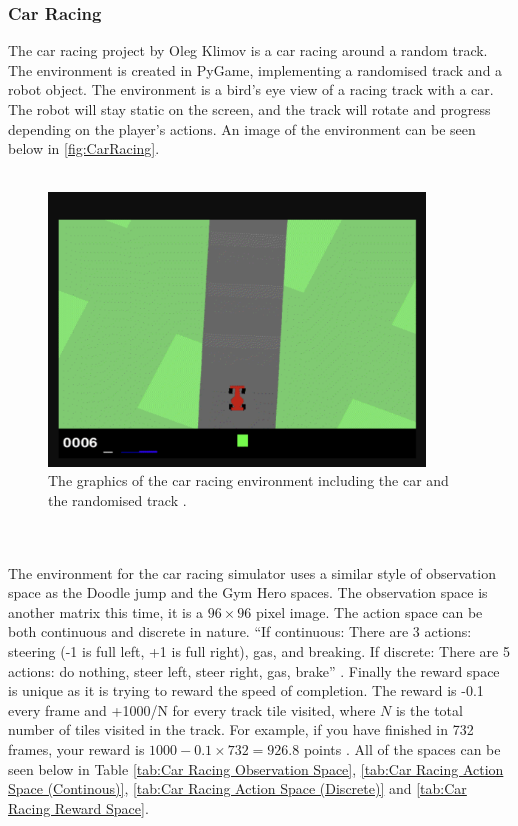 \documentclass[a4paper,12pt]{article}
\begin{document}
\subsubsection{Car Racing}
The car racing project by Oleg Klimov is a car racing around a random track. The environment is created in PyGame, implementing a randomised track and a robot object. The environment is a bird's eye view of a racing track with a car. The robot will stay static on the screen, and the track will rotate and progress depending on the player's actions. An image of the environment can be seen below in \autoref{fig:CarRacing}.
\\\\
\begin{figure}[H]
\centering
\includegraphics[width=10cm]{imgs/CarRacing.png}
\caption{The graphics of the car racing environment including the car and the randomised track \cite{Klimov}.}
\label{fig:CarRacing}
\end{figure}\\\\
The environment for the car racing simulator uses a similar style of observation space as the Doodle jump and the Gym Hero spaces. The observation space is another matrix this time, it is a $96\times96$ pixel image. The action space can be both continuous and discrete in nature. ``If continuous: There are 3 actions: steering (-1 is full left, +1 is full right), gas, and breaking. If discrete: There are 5 actions: do nothing, steer left, steer right, gas, brake'' \cite{Klimov}. Finally the reward space is unique as it is trying to reward the speed of completion. The reward is -0.1 every frame and +1000/N for every track tile visited, where $N$ is the total number of tiles visited in the track. For example, if you have finished in 732 frames, your reward is $1000 - 0.1\times732 = 926.8$ points \cite{Klimov}. All of the spaces can be seen below in Table \ref{tab:Car Racing Observation Space}, \ref{tab:Car Racing Action Space (Continous)}, \ref{tab:Car Racing Action Space (Discrete)} and \ref{tab:Car Racing Reward Space}.
\end{document}
